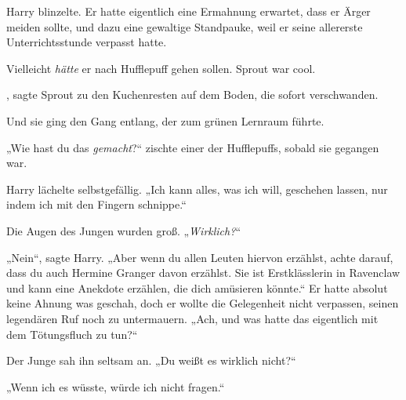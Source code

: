 Harry blinzelte. Er hatte eigentlich eine Ermahnung erwartet, dass er Ärger meiden sollte, und dazu eine gewaltige Standpauke, weil er seine allererste Unterrichtsstunde verpasst hatte.

Vielleicht \emph{hätte} er nach Hufflepuff gehen sollen. Sprout war cool.

, sagte Sprout zu den Kuchenresten auf dem Boden, die sofort verschwanden.

Und sie ging den Gang entlang, der zum grünen Lernraum führte.

„Wie hast du das \emph{gemacht}?“ zischte einer der Hufflepuffs, sobald sie gegangen war.

Harry lächelte selbstgefällig.
„Ich kann alles, was ich will, geschehen lassen, nur indem ich mit den Fingern schnippe.“

Die Augen des Jungen wurden groß.
„\emph{Wirklich?}“

„Nein“, sagte Harry.
„Aber wenn du allen Leuten hiervon erzählst, achte darauf, dass du auch Hermine Granger davon erzählst. Sie ist Erstklässlerin in Ravenclaw und kann eine Anekdote erzählen, die dich amüsieren könnte.“ Er hatte absolut keine Ahnung was geschah, doch er wollte die Gelegenheit nicht verpassen, seinen legendären Ruf noch zu untermauern.
„Ach, und was hatte das eigentlich mit dem Tötungsfluch zu tun?“

Der Junge sah ihn seltsam an.
„Du weißt es wirklich nicht?“

„Wenn ich es wüsste, würde ich nicht fragen.“

